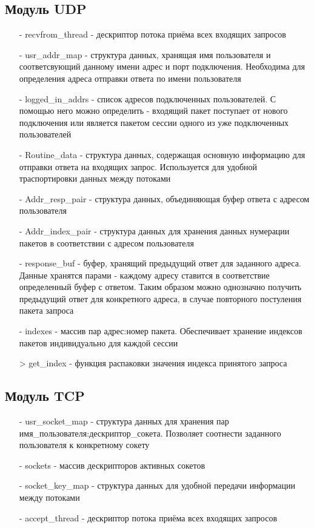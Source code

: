 \subsection{Модуль UDP}
\begin{itemize}
\item[-] recvfrom_thread - дескриптор потока приёма всех входящих запросов
\item[-] usr_addr_map - структура данных, хранящая имя пользователя и соответсвующий данному имени адрес и порт подключения. Необходима для определения адреса отправки ответа по имени пользователя
\item[-] logged_in_addrs - список адресов подключенных пользователей. С помощью него можно определить - входящий пакет поступает от нового подключения или является пакетом сессии одного из уже подключенных пользователей
\item[-] Routine_data - структура данных, содержащая основную информацию для отправки ответа на входящих запрос. Используется для удобной траспортировки данных между потоками
\item[-] Addr_resp_pair - структура данных, объединяющая буфер ответа с адресом пользователя
\item[-] Addr_index_pair - структура данных для хранения данных нумерации пакетов в соответствии с адресом пользователя 
\item[-] response_buf - буфер, хранящий предыдущий ответ для заданного адреса. Данные хранятся парами - каждому адресу ставится в соответствие определенный буфер с ответом. Таким образом можно однозначно получить предыдущий ответ для конкретного адреса, в случае повторного постуления пакета запроса
\item[-] indexes - массив пар адрес:номер пакета. Обеспечивает хранение индексов пакетов индивидуально для каждой сессии
\item[>] get_index - функция распаковки значения индекса принятого запроса
\end{itemize}

\subsection{Модуль TCP}
\begin{itemize}
\item[-] usr_socket_map - структура данных для хранения пар имя_пользователя:дескриптор_сокета. Позволяет соотнести заданного пользователя к конкретному сокету
\item[-] sockets - массив дескрипторов активных сокетов
\item[-] socket_key_map - структура данных для удобной передачи информации между потоками
\item[-] accept_thread - дескриптор потока приёма всех входящих запросов
\end{itemize}


